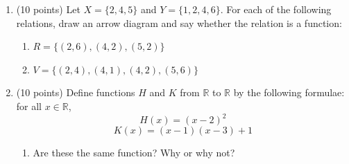 \documentclass[12pt]{article}
\begin{document}
\begin{enumerate}
\begin{enumerate}
	      \end{enumerate}
	\item (10 points) Let \( X = \{2, 4, 5\} \) and \( Y = \{1, 2, 4, 6\} \). For each of the following relations, draw an arrow diagram and say whether the relation is a function:
	      \begin{enumerate}
		      \item \( R = \{(2, 6), (4, 2), (5, 2)\} \)
		            \vspace{5cm}
		      \item \( V = \{(2, 4), (4, 1), (4, 2), (5, 6)\} \)
		            \vspace{5cm}
	      \end{enumerate}
	\item (10 points) Define functions \( H \) and \( K \) from \( \mathbb{R} \) to \( \mathbb{R} \) by the following formulae: for all \( x \in \mathbb{R} \),
	      \[
		      H(x) = (x - 2)^2
	      \]
	      \[
		      K(x) = (x - 1)(x - 3) + 1
	      \]
	      \begin{enumerate}
		      \item Are these the same function? Why or why not?
	      \end{enumerate}
\end{enumerate}
\end{document}
